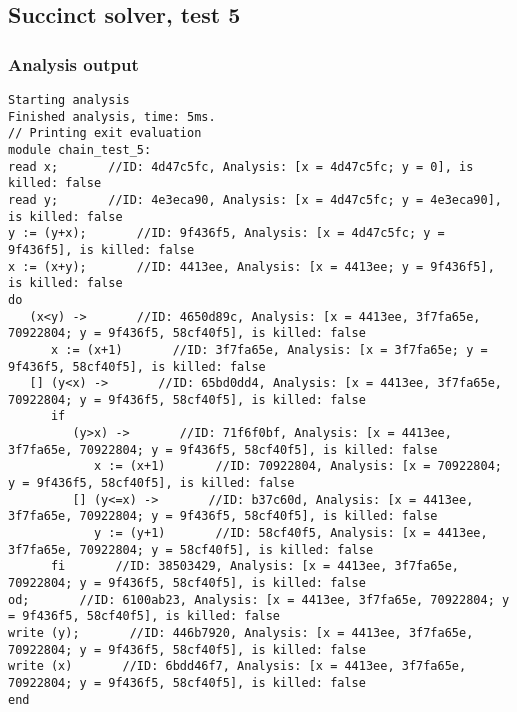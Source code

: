 \subsection{Succinct solver, test 5}
\subsubsection{Analysis output}
\begin{lstlisting}
Starting analysis
Finished analysis, time: 5ms.
// Printing exit evaluation
module chain_test_5:
read x;       //ID: 4d47c5fc, Analysis: [x = 4d47c5fc; y = 0], is killed: false
read y;       //ID: 4e3eca90, Analysis: [x = 4d47c5fc; y = 4e3eca90], is killed: false
y := (y+x);       //ID: 9f436f5, Analysis: [x = 4d47c5fc; y = 9f436f5], is killed: false
x := (x+y);       //ID: 4413ee, Analysis: [x = 4413ee; y = 9f436f5], is killed: false
do
   (x<y) ->       //ID: 4650d89c, Analysis: [x = 4413ee, 3f7fa65e, 70922804; y = 9f436f5, 58cf40f5], is killed: false
      x := (x+1)       //ID: 3f7fa65e, Analysis: [x = 3f7fa65e; y = 9f436f5, 58cf40f5], is killed: false
   [] (y<x) ->       //ID: 65bd0dd4, Analysis: [x = 4413ee, 3f7fa65e, 70922804; y = 9f436f5, 58cf40f5], is killed: false
      if
         (y>x) ->       //ID: 71f6f0bf, Analysis: [x = 4413ee, 3f7fa65e, 70922804; y = 9f436f5, 58cf40f5], is killed: false
            x := (x+1)       //ID: 70922804, Analysis: [x = 70922804; y = 9f436f5, 58cf40f5], is killed: false
         [] (y<=x) ->       //ID: b37c60d, Analysis: [x = 4413ee, 3f7fa65e, 70922804; y = 9f436f5, 58cf40f5], is killed: false
            y := (y+1)       //ID: 58cf40f5, Analysis: [x = 4413ee, 3f7fa65e, 70922804; y = 58cf40f5], is killed: false
      fi       //ID: 38503429, Analysis: [x = 4413ee, 3f7fa65e, 70922804; y = 9f436f5, 58cf40f5], is killed: false
od;       //ID: 6100ab23, Analysis: [x = 4413ee, 3f7fa65e, 70922804; y = 9f436f5, 58cf40f5], is killed: false
write (y);       //ID: 446b7920, Analysis: [x = 4413ee, 3f7fa65e, 70922804; y = 9f436f5, 58cf40f5], is killed: false
write (x)       //ID: 6bdd46f7, Analysis: [x = 4413ee, 3f7fa65e, 70922804; y = 9f436f5, 58cf40f5], is killed: false
end
\end{lstlisting}
